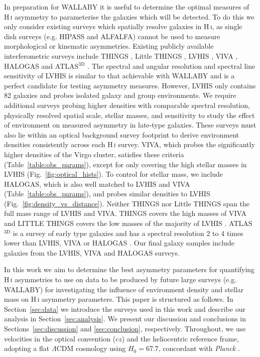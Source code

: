 \documentclass[fleqn,usenatbib]{mnras}
\begin{document}
In preparation for WALLABY it is useful to determine the optimal measures of H\,\textsc{i} asymmetry to parameterise the galaxies which will be detected. To do this we only consider existing surveys which spatially resolve galaxies in H\,\textsc{i}, as single dish surveys (e.g. HIPASS and ALFALFA) cannot be used to measure morphological or kinematic asymmetries. Existing publicly available interferometric surveys include THINGS \citep{Walter2008}, Little THINGS \citep{Hunter2012}, LVHIS \citep{Koribalski2018}, VIVA \citep{Chung2009}, HALOGAS \citep{Heald2011} and ATLAS$^{3\mathrm{D}}$ \citep{Cappellari2011}. The spectral and angular resolution and spectral line sensitivity of LVHIS is similar to that achievable with WALLABY \citep{Koribalski2018} and is a perfect candidate for testing asymmetry measures. However, LVHIS only contains 82 galaxies and probes isolated galaxy and group environments. We require additional surveys probing higher densities with comparable spectral resolution, physically resolved spatial scale, stellar masses, and sensitivity to study the effect of environment on measured asymmetry in late-type galaxies. These surveys must also lie within an optical background survey footprint \citep[e.g. SDSS or 6dFGS,][respectively]{Strauss2002,Jones2009} to derive environment densities consistently across each H\,\textsc{i} survey. VIVA, which probes the significantly higher densities of the Virgo cluster, satisfies these criteria (Table~\ref{table:obs_params}), except for only covering the high stellar masses in LVHIS (Fig.~\ref{fig:optical_hists}). To control for stellar mass, we include HALOGAS, which is also well matched to LVHIS and VIVA (Table~\ref{table:obs_params}), and probes similar densities to LVHIS (Fig.~\ref{fig:density_vs_distance}). Neither THINGS nor Little THINGS span the full mass range of LVHIS and VIVA. THINGS covers the high masses of VIVA \citep{deblok2008} and LITTLE THINGS covers the low masses of the majority of LVHIS \citep{Oh2015}. ATLAS$^{3\mathrm{D}}$ is a survey of early type galaxies and has a spectral resolution 2 to 4 times lower than LVHIS, VIVA or HALOGAS \citep{Serra2012}. Our final galaxy samples include galaxies from the LVHIS, VIVA and HALOGAS surveys.

In this work we aim to determine the best asymmetry parameters for quantifying H\,\textsc{i} asymmetries to use on data to be produced by future large surveys (e.g. WALLABY) for investigating the influence of environment density and stellar mass on H\,\textsc{i} asymmetry parameters. This paper is structured as follows. In Section~\ref{sec:data} we introduce the surveys used in this work and describe our analysis in Section~\ref{sec:analysis}. We present our discussion and conclusions in Sections~\ref{sec:discussion} and \ref{sec:conclusion}, respectively. Throughout, we use velocities in the optical convention ($cz$) and the heliocentric reference frame, adopting a flat $\Lambda$CDM cosmology using $H_0=67.7$, concordant with \textit{Planck} \citep{Planck2016}.
\end{document}
